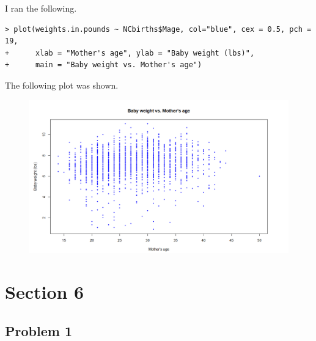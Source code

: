 \documentclass[12pt]{article}
\begin{document}
I ran the following.
\scriptsize
\begin{verbatim}
> plot(weights.in.pounds ~ NCbirths$Mage, col="blue", cex = 0.5, pch = 19,
+      xlab = "Mother's age", ylab = "Baby weight (lbs)",
+      main = "Baby weight vs. Mother's age")
\end{verbatim}
\normalsize
The following plot was shown.
\begin{figure}[H]
    \begin{center}
        \includegraphics[width=5in]{section5problem1.png}
    \end{center}
\end{figure}

\section*{Section 6}

\subsection*{Problem 1}
\end{document}
